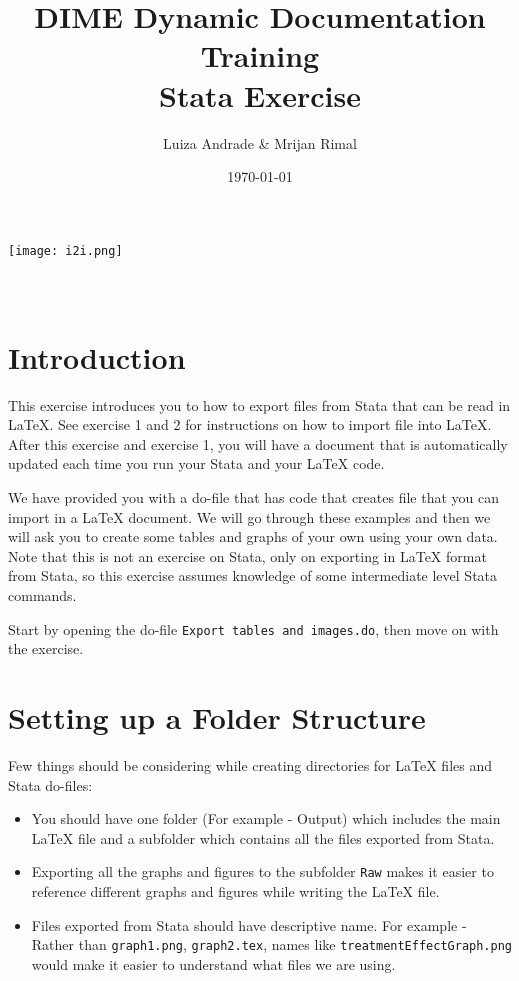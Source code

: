 \documentclass[]{article}
\title{DIME Dynamic Documentation Training \\ Stata Exercise}
\author{Luiza Andrade \& Mrijan Rimal}
\date{\today}
\begin{document}
\makeatletter
\begin{titlepage}
	\begin{center}
		\texttt{[image: i2i.png]}\\[10ex]
		{\LARGE \bfseries  \@title }\\[2ex] 
		{\Large  \@author}\\[20ex] 
		{\large \@date}
	\end{center}
\end{titlepage}
\makeatother

\section*{Introduction}
This exercise introduces you to how to export files from Stata that can be read in {\LaTeX}. See exercise 1 and 2 for instructions on how to import file into {\LaTeX}. After this exercise and exercise 1, you will have a document that is automatically updated each time you run your Stata and your {\LaTeX} code.

We have provided you with a do-file that has code that creates file that you can import in a {\LaTeX} document. We will go through these examples and then we will ask you to create some tables and graphs of your own using your own data. Note that this is not an exercise on Stata, only on exporting in {\LaTeX} format from Stata, so this exercise assumes knowledge of some intermediate level Stata commands.

Start by opening the do-file \texttt{Export tables and images.do}, then move on with the exercise.

\section*{Setting up a Folder Structure}

Few things should be considering while creating directories for {\LaTeX} files and Stata do-files:

\begin{itemize}
	\item You should have one folder (For example - Output) which includes the main {\LaTeX} file and a subfolder which contains all the files exported from Stata. 
	\item Exporting all the graphs and figures to the subfolder \texttt{Raw} makes it easier to reference different graphs and figures while writing the {\LaTeX} file. 
	\item Files exported from Stata should have descriptive name. For example - Rather than \texttt{graph1.png}, \texttt{graph2.tex}, names like \texttt{treatmentEffectGraph.png} would make it easier to understand what files we are using.
\end{itemize}
\end{document}
